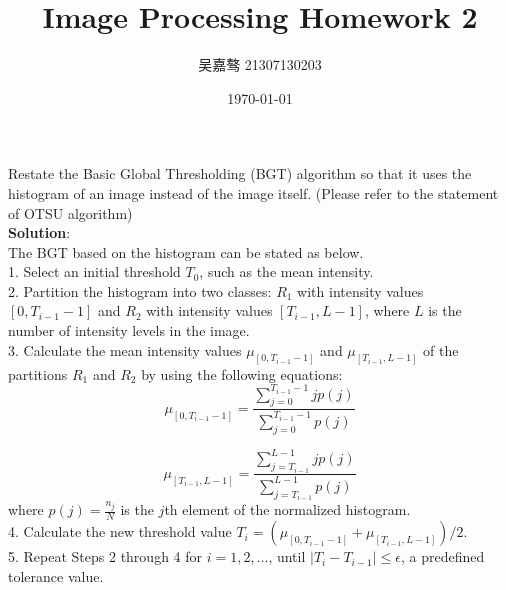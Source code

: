 \documentclass[UTF8]{ctexart}
\title{\textbf{Image Processing Homework 2}}
\author{吴嘉骜 21307130203}
\date{\today}
\begin{document}
\maketitle

\noindent
\section{}
\setlength{\parindent}{0pt}
Restate the Basic Global Thresholding (BGT) algorithm so that it uses the histogram of an image instead of the image itself. (Please refer to the statement of OTSU algorithm)\\
\textbf{Solution}:\\
The BGT based on the histogram can be stated as below.\\
1. Select an initial threshold $T_0$, such as the mean intensity.\\
2. Partition the histogram into two classes: $R_1$ with intensity values $[0, T_{i-1}-1]$ and $R_2$ with intensity values $[T_{i-1}, L - 1]$, where $L$ is the number of intensity levels in the image.\\
3. Calculate the mean intensity values $\mu_{[0,T_{i-1}-1]}$ and $\mu_{[T_{i-1},L-1]}$ of the partitions $R_1$ and $R_2$ by using the following equations:\\
\begin{equation*}
    \mu_{[0,T_{i-1}-1]} = \frac{\sum\limits_{j=0}^{T_{i-1}-1} j p(j)}{\sum\limits_{j=0}^{T_{i-1}-1} p(j)}
\end{equation*}

\begin{equation*}
    \mu_{[T_{i-1},L-1]} = \frac{\sum\limits_{j=T_{i-1}}^{L-1} j p(j)}{\sum\limits_{j=T_{i-1}}^{L-1} p(j)}
\end{equation*}
where $p(j) = \frac{n_j}{N}$ is the $j$th element of the normalized histogram.\\
4. Calculate the new threshold value $T_i = (\mu_{[0,T_{i-1}-1]}+\mu_{[T_{i-1},L-1]})/2$.\\
5. Repeat Steps 2 through 4 for $i = 1,2,\ldots$, until $|T_i - T_{i-1}| \leq \epsilon$, a predefined tolerance value.\\
\end{document}
